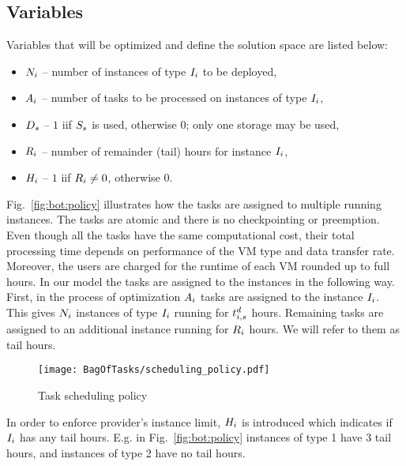 {\subsection{Variables}
\label{sec:varialbes}
  Variables that will be optimized and define the solution space are listed below:
  \begin{itemize}
      \item $N_i$ -- number of instances of type $I_i$
      to be deployed,
      \item $A_i$ -- number of tasks to be processed on
      instances of type $I_i$,
      \item $D_s$ -- $1$ iif $S_s$ is used, otherwise $0$; only one storage may be used,
      \item $R_i$ -- number of remainder (tail) hours for
      instance $I_i$,
      \item $H_i$ -- $1$ iif $R_i \neq 0$, otherwise $0$.
  \end{itemize}


  Fig.~\ref{fig:bot:policy} illustrates how the tasks are assigned to multiple running instances. The tasks are atomic and there is no checkpointing or preemption. Even though all the tasks have the same computational cost, their total processing time depends on performance of the VM type and data transfer rate. Moreover, the users are charged for the runtime of each VM rounded up to full hours. In our model the tasks are assigned to the instances in the following way. First, in the process of optimization $A_i$ tasks are assigned to the instance $I_i$. This gives $N_i$  instances of type $I_i$ running for $t^d_{i,s}$ hours. Remaining tasks are assigned to an additional instance running for $R_i$ hours. We will refer to them as tail hours.

  \begin{figure}[tb] 
     \centering
     \texttt{[image: BagOfTasks/scheduling\_policy.pdf]}
     \caption{\label{fig:policy}Task scheduling policy}
  \end{figure}
    

  In order to enforce provider's instance limit, $H_i$ is introduced which indicates if $I_i$ has any tail hours. E.g. in Fig.~\ref{fig:bot:policy} instances of type 1 have 3 tail hours, and instances of type 2 have no tail hours.


}
